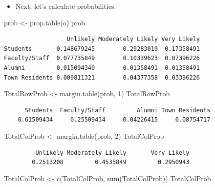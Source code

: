 \documentclass[
  letterpaper,
  DIV=11,
  numbers=noendperiod]{scrreprt}
\newenvironment{Shaded}{\begin{snugshade}}{\end{snugshade}}
\newcommand{\DecValTok}[1]{\textcolor[rgb]{0.68,0.00,0.00}{#1}}
\newcommand{\FunctionTok}[1]{\textcolor[rgb]{0.28,0.35,0.67}{#1}}
\newcommand{\NormalTok}[1]{\textcolor[rgb]{0.00,0.23,0.31}{#1}}
\newcommand{\OtherTok}[1]{\textcolor[rgb]{0.00,0.23,0.31}{#1}}
\providecommand{\tightlist}{%
  \setlength{\itemsep}{0pt}\setlength{\parskip}{0pt}}\usepackage{longtable,booktabs,array}
\begin{document}
\begin{itemize}
\tightlist
\item
  Next, let's calculate probabilities.
\end{itemize}

\begin{Shaded}
\begin{Highlighting}[]
\NormalTok{prob }\OtherTok{\textless{}{-}} \FunctionTok{prop.table}\NormalTok{(o)}
\NormalTok{prob}
\end{Highlighting}
\end{Shaded}

\begin{verbatim}
                  Unlikely Moderately Likely Very Likely
Students       0.148679245        0.29283019  0.17358491
Faculty/Staff  0.077735849        0.10339623  0.07396226
Alumni         0.015094340        0.01358491  0.01358491
Town Residents 0.009811321        0.04377358  0.03396226
\end{verbatim}

\begin{Shaded}
\begin{Highlighting}[]
\NormalTok{TotalRowProb }\OtherTok{\textless{}{-}} \FunctionTok{margin.table}\NormalTok{(prob, }\DecValTok{1}\NormalTok{)}
\NormalTok{TotalRowProb}
\end{Highlighting}
\end{Shaded}

\begin{verbatim}
      Students  Faculty/Staff         Alumni Town Residents 
    0.61509434     0.25509434     0.04226415     0.08754717 
\end{verbatim}

\begin{Shaded}
\begin{Highlighting}[]
\NormalTok{TotalColProb }\OtherTok{\textless{}{-}} \FunctionTok{margin.table}\NormalTok{(prob, }\DecValTok{2}\NormalTok{)}
\NormalTok{TotalColProb}
\end{Highlighting}
\end{Shaded}

\begin{verbatim}
         Unlikely Moderately Likely       Very Likely 
        0.2513208         0.4535849         0.2950943 
\end{verbatim}

\begin{Shaded}
\begin{Highlighting}[]
\NormalTok{TotalColProb }\OtherTok{\textless{}{-}} \FunctionTok{c}\NormalTok{(TotalColProb, }\FunctionTok{sum}\NormalTok{(TotalColProb))}
\NormalTok{TotalColProb}
\end{Highlighting}
\end{Shaded}
\end{document}
